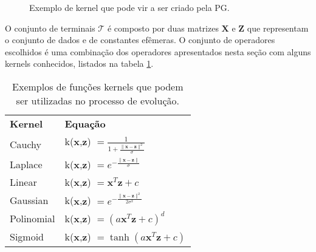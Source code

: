\begin{figure}[H]
\caption{Exemplo de kernel que pode vir a ser criado pela PG.}
\begin{center}
\end{center}
\end{figure}

O conjunto de terminais ${\mathcal T}$ é composto por duas matrizes ${\mathbf X}$ e ${\mathbf Z}$ que representam o conjunto de dados e de constantes efêmeras. O conjunto de operadores escolhidos é uma combinação dos operadores apresentados nesta seção com alguns kernels conhecidos, listados na tabela \ref{Tabela1}.

\begin{table}
\caption{Exemplos de funções kernels que podem ser utilizadas no processo de evolução.}
\begin{center} \label{Tabela1}
\begin{tabular}{l@{\hskip 18pt}l}
\hline\noalign{\smallskip}
\textbf{Kernel} & \textbf{Equação} \\
\noalign{\smallskip}
\hline
\noalign{\smallskip}
Cauchy 		& k(${\mathbf x}$,${\mathbf z}$) $= \frac{1}{1 + \frac{\|\mathbf{x} - \mathbf{z}\|^2}{\sigma}}$ \\
Laplace		& k(${\mathbf x}$,${\mathbf z}$) $= e^{-\frac{\|\mathbf{x} - \mathbf{z}\|}{\sigma}}$ \\
Linear		& k(${\mathbf x}$,${\mathbf z}$) $= \mathbf{x}^T\mathbf{z} + c$ \\
Gaussian	& k(${\mathbf x}$,${\mathbf z}$) $= e^{-\frac{\|\mathbf{x} - \mathbf{z}\|^2}{2\sigma^2}}$ \\
Polinomial	& k(${\mathbf x}$,${\mathbf z}$) $= (a\mathbf{x}^T\mathbf{z} + c)^d$ \\
Sigmoid		& k(${\mathbf x}$,${\mathbf z}$) $= \tanh(a\mathbf{x}^T\mathbf{z} + c)$ \\
\hline
\end{tabular}
\end{center}
\end{table}

